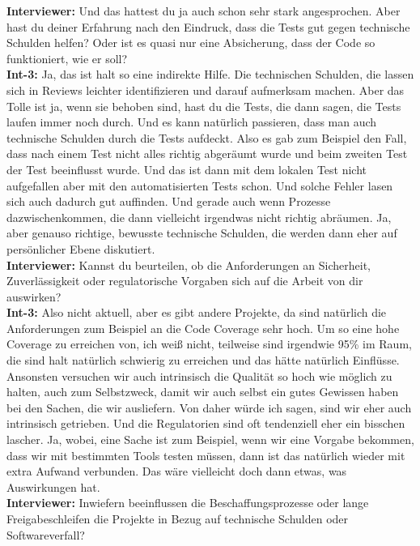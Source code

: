 \textbf{Interviewer:} Und das hattest du ja auch schon sehr stark angesprochen. Aber hast du deiner Erfahrung nach den Eindruck, dass die Tests gut gegen technische Schulden helfen? Oder ist es quasi nur eine Absicherung, dass der Code so funktioniert, wie er soll?\\
\textbf{Int-3:} Ja, das ist halt so eine indirekte Hilfe. Die technischen Schulden, die lassen sich in Reviews leichter identifizieren und darauf aufmerksam machen. Aber das Tolle ist ja, wenn sie behoben sind, hast du die Tests, die dann sagen, die Tests laufen immer noch durch. Und es kann natürlich passieren, dass man auch technische Schulden durch die Tests aufdeckt. Also es gab zum Beispiel den Fall, dass nach einem Test nicht alles richtig abgeräumt wurde und beim zweiten Test der Test beeinflusst wurde. Und das ist dann mit dem lokalen Test nicht aufgefallen aber mit den automatisierten Tests schon. Und solche Fehler lasen sich auch dadurch gut auffinden. Und gerade auch wenn Prozesse dazwischenkommen, die dann vielleicht irgendwas nicht richtig abräumen. Ja, aber genauso richtige, bewusste technische Schulden, die werden dann eher auf persönlicher Ebene diskutiert. \\
\textbf{Interviewer:} Kannst du beurteilen, ob die Anforderungen an Sicherheit, Zuverlässigkeit oder regulatorische Vorgaben sich auf die Arbeit von dir auswirken?\\
\textbf{Int-3:} Also nicht aktuell, aber es gibt andere Projekte, da sind natürlich die Anforderungen zum Beispiel an die Code Coverage sehr hoch. Um so eine hohe Coverage zu erreichen von, ich weiß nicht, teilweise sind irgendwie 95\% im Raum, die sind halt natürlich schwierig zu erreichen und das hätte natürlich Einflüsse. Ansonsten versuchen wir auch intrinsisch die Qualität so hoch wie möglich zu halten, auch zum Selbstzweck, damit wir auch selbst ein gutes Gewissen haben bei den Sachen, die wir ausliefern. Von daher würde ich sagen, sind wir eher auch intrinsisch getrieben. Und die Regulatorien sind oft tendenziell eher ein bisschen lascher. Ja, wobei, eine Sache ist zum Beispiel, wenn wir eine Vorgabe bekommen, dass wir mit bestimmten Tools testen müssen, dann ist das natürlich wieder mit extra Aufwand verbunden. Das wäre vielleicht doch dann etwas, was Auswirkungen hat.\\
\textbf{Interviewer:} Inwiefern beeinflussen die Beschaffungsprozesse oder lange Freigabeschleifen die Projekte in Bezug auf technische Schulden oder Softwareverfall?\\

